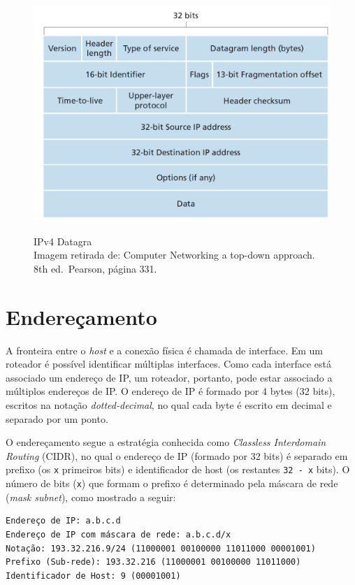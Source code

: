 \begin{figure}[h!]
\centering
\includegraphics[keepaspectratio, width=12cm, height=9cm]{imagens/13/13 - IPv4 Datagram.png}
\caption{IPv4 Datagra \\
Imagem retirada de: Computer Networking a top-down approach. 8th
ed.~Pearson, página 331. \\}
\label{IPv4 Datagra }
\end{figure}





\hypertarget{endereuxe7amento}{%
\section{Endereçamento}\label{endereuxe7amento}}

A fronteira entre o \emph{host} e a conexão física é chamada de
interface. Em um roteador é possível identificar múltiplas interfaces.
Como cada interface está associado um endereço de IP, um roteador,
portanto, pode estar associado a múltiplos endereços de IP. O endereço
de IP é formado por 4 bytes (32 bits), escritos na notação
\emph{dotted-decimal}, no qual cada byte é escrito em decimal e separado
por um ponto.

O endereçamento segue a estratégia conhecida como \emph{Classless
Interdomain Routing} (CIDR), no qual o endereço de IP (formado por 32
bits) é separado em prefixo (os \texttt{x} primeiros bits) e
identificador de host (os restantes \texttt{32\ -\ x} bits). O número de
bits (\texttt{x}) que formam o prefixo é determinado pela máscara de
rede (\emph{mask subnet}), como mostrado a seguir:

\begin{verbatim}
Endereço de IP: a.b.c.d
Endereço de IP com máscara de rede: a.b.c.d/x
Notação: 193.32.216.9/24 (11000001 00100000 11011000 00001001)
Prefixo (Sub-rede): 193.32.216 (11000001 00100000 11011000)
Identificador de Host: 9 (00001001)
\end{verbatim}

